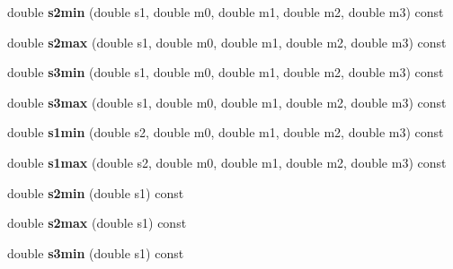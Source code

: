 \begin{DoxyCompactItemize}
\item 
\hypertarget{class_d_p_kinematics_ad0e80867e1342e43d0cea1ff5082e410}{double {\bfseries s2min} (double s1, double m0, double m1, double m2, double m3) const }\label{class_d_p_kinematics_ad0e80867e1342e43d0cea1ff5082e410}

\item 
\hypertarget{class_d_p_kinematics_a27e6de1d8ddab1595b1e8ba12d36c6cb}{double {\bfseries s2max} (double s1, double m0, double m1, double m2, double m3) const }\label{class_d_p_kinematics_a27e6de1d8ddab1595b1e8ba12d36c6cb}

\item 
\hypertarget{class_d_p_kinematics_a08e26bcc961b2061c811d7703cc6ee3f}{double {\bfseries s3min} (double s1, double m0, double m1, double m2, double m3) const }\label{class_d_p_kinematics_a08e26bcc961b2061c811d7703cc6ee3f}

\item 
\hypertarget{class_d_p_kinematics_a38ea1190dea02379bcdd86e9b9569d29}{double {\bfseries s3max} (double s1, double m0, double m1, double m2, double m3) const }\label{class_d_p_kinematics_a38ea1190dea02379bcdd86e9b9569d29}

\item 
\hypertarget{class_d_p_kinematics_a5d8aa4bf0bf44e284b690d0372f28fb5}{double {\bfseries s1min} (double s2, double m0, double m1, double m2, double m3) const }\label{class_d_p_kinematics_a5d8aa4bf0bf44e284b690d0372f28fb5}

\item 
\hypertarget{class_d_p_kinematics_a6c1f5182155d78ea8f2657320962eb6a}{double {\bfseries s1max} (double s2, double m0, double m1, double m2, double m3) const }\label{class_d_p_kinematics_a6c1f5182155d78ea8f2657320962eb6a}

\item 
\hypertarget{class_d_p_kinematics_a46920faf34f63f7bb45709cd4232fde5}{double {\bfseries s2min} (double s1) const }\label{class_d_p_kinematics_a46920faf34f63f7bb45709cd4232fde5}

\item 
\hypertarget{class_d_p_kinematics_a0e2cdfd54772131fc5caf718c95a7ed4}{double {\bfseries s2max} (double s1) const }\label{class_d_p_kinematics_a0e2cdfd54772131fc5caf718c95a7ed4}

\item 
\hypertarget{class_d_p_kinematics_aaf16ad2f575a0eacf4f7f8eeb198457d}{double {\bfseries s3min} (double s1) const }\label{class_d_p_kinematics_aaf16ad2f575a0eacf4f7f8eeb198457d}


\end{DoxyCompactItemize}
